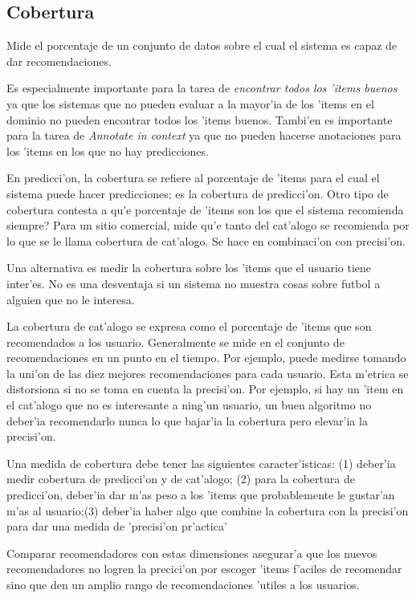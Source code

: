 \documentclass[11pt]{article}
\begin{document}
\subsection{Cobertura}
Mide el porcentaje de un conjunto de datos sobre el cual el sistema es capaz de dar recomendaciones.

Es especialmente importante para la tarea de \textit{encontrar todos los 'items buenos} ya que los sistemas que no pueden evaluar a la mayor'ia de los 'items en el dominio no pueden encontrar todos los 'items buenos. Tambi'en es importante para la tarea de \textit{Annotate in context} ya que no pueden hacerse anotaciones para los 'items en los que no hay predicciones.

En predicci'on, la cobertura se refiere al porcentaje de 'items para el cual el sistema puede hacer predicciones; es la cobertura de predicci'on. Otro tipo de cobertura contesta a \textquestiondown qu'e porcentaje de 'items son los que el sistema recomienda siempre? Para un sitio comercial, mide qu'e tanto del cat'alogo se recomienda por lo que se le llama cobertura de cat'alogo. Se hace en combinaci'on con precisi'on.

Una alternativa es medir la cobertura sobre los 'items que el usuario tiene inter'es. No es una desventaja si un sistema no muestra cosas sobre futbol a alguien que no le interesa.

La cobertura de cat'alogo se expresa como el porcentaje de 'items que son recomendados a los usuario. Generalmente se mide en el conjunto de recomendaciones en un punto en el tiempo. Por ejemplo, puede medirse tomando la uni'on de las diez mejores recomendaciones para cada usuario. Esta m'etrica se distorsiona si no se toma en cuenta la precisi'on. Por ejemplo, si hay un 'item en el cat'alogo que no es interesante a ning'un usuario, un buen algoritmo no deber'ia recomendarlo nunca lo que bajar'ia la cobertura pero elevar'ia la precisi'on.

Una medida de cobertura debe tener las siguientes caracter'isticas: (1) deber'ia medir cobertura de predicci'on y de cat'alogo; (2) para la cobertura de predicci'on, deber'ia dar m'as peso a los 'items que probablemente le gustar'an m'as al usuario;(3) deber'ia haber algo que combine la cobertura con la precisi'on para dar una medida de 'precisi'on pr'actica'

Comparar recomendadores con estas dimensiones asegurar'a que los nuevos recomendadores no logren la precici'on por escoger 'items f'aciles de recomendar sino que den un amplio rango de recomendaciones 'utiles a los usuarios.
\end{document}
